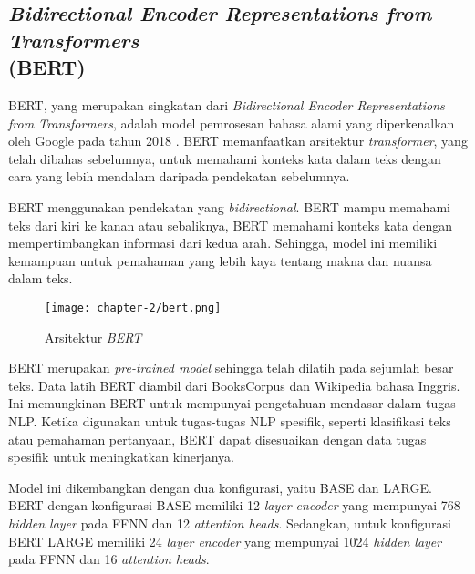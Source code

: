 \subsection{\textit{Bidirectional Encoder Representations from Transformers} \\ (BERT)}

BERT, yang merupakan singkatan dari \textit{Bidirectional Encoder Representations from Transformers}, adalah model pemrosesan bahasa alami yang diperkenalkan oleh Google pada tahun 2018 \parencite{bert}. BERT memanfaatkan arsitektur \textit{transformer}, yang telah dibahas sebelumnya, untuk memahami konteks kata dalam teks dengan cara yang lebih mendalam daripada pendekatan sebelumnya.

BERT menggunakan pendekatan yang \textit{bidirectional}. BERT mampu memahami teks dari kiri ke kanan atau sebaliknya, BERT memahami konteks kata dengan mempertimbangkan informasi dari kedua arah. Sehingga, model ini memiliki kemampuan untuk pemahaman yang lebih kaya tentang makna dan nuansa dalam teks.

\begin{figure}[ht]
    \centering
    \texttt{[image: chapter-2/bert.png]}
    \caption{Arsitektur \textit{BERT} \parencite{bert}}
    \label{fig:bert}
\end{figure}

BERT merupakan \textit{pre-trained model} sehingga telah dilatih pada sejumlah besar teks. Data latih BERT diambil dari BooksCorpus dan Wikipedia bahasa Inggris. Ini memungkinan BERT untuk mempunyai pengetahuan mendasar dalam tugas NLP. Ketika digunakan untuk tugas-tugas NLP spesifik, seperti klasifikasi teks atau pemahaman pertanyaan, BERT dapat disesuaikan dengan data tugas spesifik untuk meningkatkan kinerjanya.

Model ini dikembangkan dengan dua konfigurasi, yaitu BASE dan LARGE. BERT dengan konfigurasi BASE memiliki 12 \textit{layer encoder} yang mempunyai 768 \textit{hidden layer} pada FFNN dan 12 \textit{attention heads}. Sedangkan, untuk konfigurasi BERT LARGE memiliki 24 \textit{layer encoder} yang mempunyai 1024 \textit{hidden layer} pada FFNN dan 16 \textit{attention heads}.
